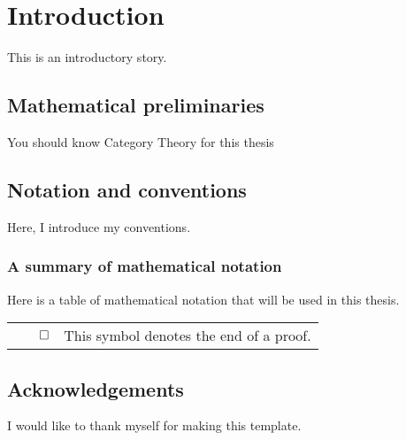 \documentclass[12pt]{article}
\begin{document}
	\section{Introduction}\label{sec:introduction}
	This is an introductory story.
	\subsection{Mathematical preliminaries}
	You should know Category Theory for this thesis\cite{rudin_principles_1976}
	\subsection{Notation and conventions}
	Here, I introduce my conventions.
	\subsubsection{A summary of mathematical notation}
    Here is a table of mathematical notation that will be used in this thesis.\\
	{\renewcommand\tabularxcolumn[1]{m{#1}}
	\renewcommand{\arraystretch}{1.5}
	\begin{tabularx}{\textwidth}{ c X }
		\(\qed\) & This symbol denotes the end of a proof.
	\end{tabularx}}
	\subsection{Acknowledgements}
	I would like to thank myself for making this template.
\end{document}
